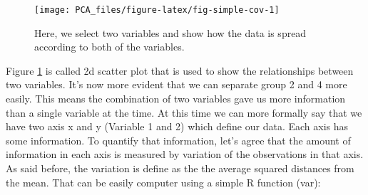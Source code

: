 \documentclass[
]{book}
\newenvironment{Shaded}{\begin{snugshade}}{\end{snugshade}}
\newcommand{\CommentTok}[1]{\textcolor[rgb]{0.56,0.35,0.01}{\textit{#1}}}
\newcommand{\DataTypeTok}[1]{\textcolor[rgb]{0.13,0.29,0.53}{#1}}
\newcommand{\DecValTok}[1]{\textcolor[rgb]{0.00,0.00,0.81}{#1}}
\newcommand{\FloatTok}[1]{\textcolor[rgb]{0.00,0.00,0.81}{#1}}
\newcommand{\KeywordTok}[1]{\textcolor[rgb]{0.13,0.29,0.53}{\textbf{#1}}}
\newcommand{\NormalTok}[1]{#1}
\newcommand{\OperatorTok}[1]{\textcolor[rgb]{0.81,0.36,0.00}{\textbf{#1}}}
\newcommand{\StringTok}[1]{\textcolor[rgb]{0.31,0.60,0.02}{#1}}
\theoremstyle{definition}
\theoremstyle{definition}
\theoremstyle{definition}
\theoremstyle{remark}
\begin{document}
\begin{Shaded}
\end{Shaded}

\begin{figure}

{\centering \texttt{[image: PCA\_files/figure-latex/fig-simple-cov-1]} 

}

\caption{Here, we select two variables and show how the data is spread according to both of the variables.}\label{fig:fig-simple-cov}
\end{figure}

Figure \ref{fig:fig-simple-cov} is called 2d scatter plot that is used to show the relationships between two variables. It's now more evident that we can separate group 2 and 4 more easily. This means the combination of two variables gave us more information than a single variable at the time. At this time we can more formally say that we have two axis x and y (Variable 1 and 2) which define our data. Each axis has some information. To quantify that information, let's agree that the amount of information in each axis is measured by variation of the observations in that axis.
As said before, the variation is define as the the average squared distances from the mean. That can be easily computer using a simple R function (var):
\end{document}

